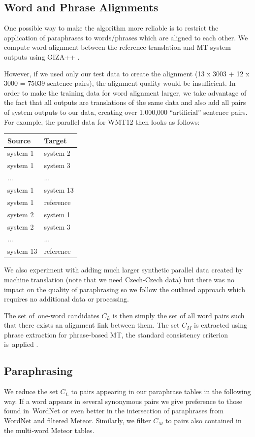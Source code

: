 \documentclass[11pt]{article}
\def\equo#1{``#1''}
\begin{document}
\subsection*{Word and Phrase Alignments}
One possible way to make the algorithm more reliable is to restrict the 
application of paraphrases to words/phrases which are aligned to each other. We 
compute word alignment between the reference translation and MT system outputs 
using GIZA++ \cite{gizapp}.

However, if we used only our test data to create the alignment (13 x 3003 + 12 
x 3000 = 75039 sentence pairs), the alignment quality would be insufficient. In 
order to make the training data for word alignment larger, we take advantage of 
the fact that all outputs are translations of the same data and also add all 
pairs of system outputs to our data, creating over 1,000,000 \equo{artificial} 
sentence pairs. For example, the parallel data for WMT12 then looks as follows:

\begin{center}
\begin{tabular}{ll}
Source & Target \\
\hline
system 1 & system 2 \\
system 1 & system 3 \\
... & ...\\
system 1 & system 13 \\
system 1 & reference \\
system 2 & system 1 \\
system 2 & system 3 \\
... & ... \\
system 13 & reference \\
\end{tabular}
\end{center}

We also experiment with adding much larger synthetic parallel data created by
machine translation (note that we need Czech-Czech data) but there was no 
impact on the quality of paraphrasing so we follow the outlined approach which 
requires no additional data or processing.

The set of~one-word candidates $C_L$ is then simply the set of all word pairs 
such that there exists an alignment link between them. The set $C_M$ is 
extracted using phrase extraction for phrase-based MT, the standard consistency 
criterion is~applied \cite{Och99improvedalignment}.

\subsection{Paraphrasing}
We reduce the set $ C_{L} $ to pairs appearing in our paraphrase tables in the 
following way. If a word appears in several synonymous pairs we give preference 
to those found in~WordNet or even better in the intersection of paraphrases 
from WordNet and filtered Meteor. Similarly, we filter $ C_{M} $ to pairs also 
contained in the multi-word Meteor tables.
\end{document}
